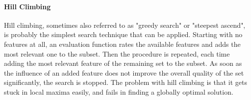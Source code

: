 \paragraph{Hill Climbing}
\label{par:methods.flat.wrapper.hill_climbing}


Hill climbing, sometimes also referred to as "greedy search" or "steepest ascend", is probably the simplest search technique that can be applied. Starting with no features at all, an evaluation function  rates the available features and adds the most relevant one to the subset. Then the procedure is repeated, each time adding the most relevant feature of the remaining set to the subset. As soon as the influence of an added feature does not improve the overall quality of the set significantly, the search is stopped. The problem with hill climbing is that it gets stuck in local maxima easily, and fails in finding a globally optimal solution. \cite{Kohavi:97}